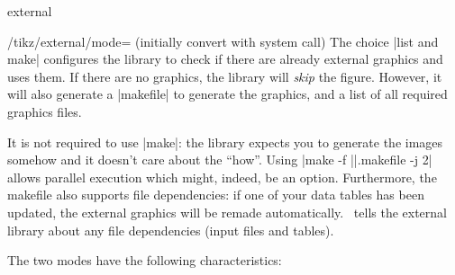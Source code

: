 {\begin{pgfplotslibrary}{external}
\begin{key}{/tikz/external/mode= (initially convert with system call)}
	The choice |list and make| configures the library to check if there are already external graphics and uses them. If there are no graphics, the library will \emph{skip} the figure. However, it will also generate a |makefile| to generate the graphics, and a list of all required graphics files.

	It is not required to use |make|: the library expects you to generate the images somehow and it doesn't care about the ``how''. Using |make -f ||.makefile -j 2| allows parallel execution which might, indeed, be an option. Furthermore, the makefile also supports file dependencies: if one of your data tables has been updated, the external graphics will be remade automatically. \PGFPlots\ tells the external library about any file dependencies (input files and tables).

	The two modes have the following characteristics:
\end{key}


\end{pgfplotslibrary}}
